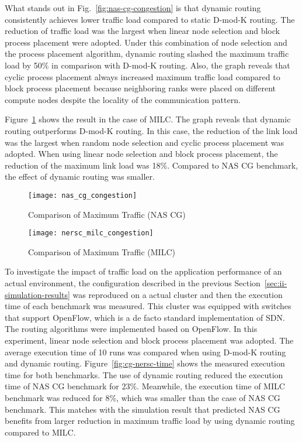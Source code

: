 What stands out in Fig.~\ref{fig:nas-cg-congestion} is that
dynamic routing consistently achieves lower traffic load compared to
static \mbox{D-mod-K} routing. The reduction of traffic load was the largest
when linear node selection and block process placement were adopted. Under
this combination of node selection and the process placement algorithm,
dynamic routing slashed the maximum traffic load by 50\% in comparison with
\mbox{D-mod-K} routing. Also, the graph reveals that cyclic process
placement always increased maximum traffic load compared to block process
placement because neighboring ranks were placed on different compute nodes
despite the locality of the communication pattern.

Figure~\ref{fig:nersc-milc-congestion} shows the result in the case of
MILC\@. The graph reveals that dynamic routing outperforms \mbox{D-mod-K}
routing. In this case, the reduction of the link load was the largest when
random node selection and cyclic process placement was adopted. When using
linear node selection and block process placement, the reduction of the
maximum link load was 18\%. Compared to NAS CG benchmark, the effect of
dynamic routing was smaller.

\begin{figure}
    \centering
    \texttt{[image: nas\_cg\_congestion]}
    \caption{Comparison of Maximum Traffic (NAS CG)}%
    \label{fig:nas-cg-congestion}

    \vspace*{\floatsep}

    \centering
    \texttt{[image: nersc\_milc\_congestion]}
    \caption{Comparison of Maximum Traffic (MILC)}%
    \label{fig:nersc-milc-congestion}
\end{figure}

To investigate the impact of traffic load on the application performance of an
actual environment, the configuration described in the previous
Section~\ref{sec:ii-simulation-results} was reproduced on a actual cluster and
then the execution time of each benchmark was measured. This cluster was
equipped with switches that support OpenFlow, which is a de facto standard
implementation of SDN\@. The routing algorithms were implemented based on
OpenFlow. In this experiment, linear node selection and block process
placement was adopted. The average execution time of 10 runs was compared when
using \mbox{D-mod-K} routing and dynamic routing.
Figure~\ref{fig:cg-nersc-time} shows the measured execution time for both
benchmarks. The use of dynamic routing reduced the execution time of NAS CG
benchmark for 23\%. Meanwhile, the execution time of MILC benchmark was
reduced for 8\%, which was smaller than the case of NAS CG benchmark. This
matches with the simulation result that predicted NAS CG benefits from larger
reduction in maximum traffic load by using dynamic routing compared to MILC\@.

